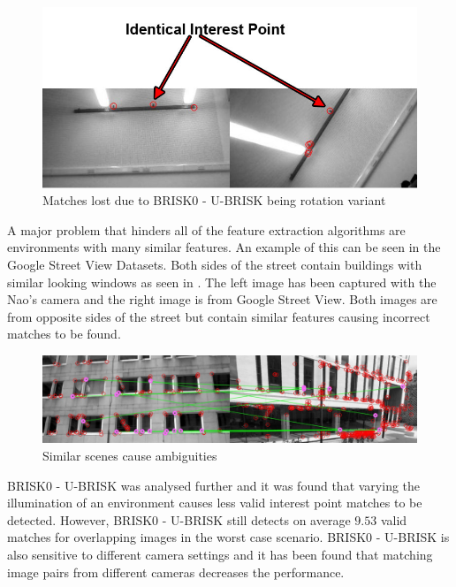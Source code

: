 \begin{figure}
  \centering
    \includegraphics[width=1.0\textwidth]{../Drawings/Matching/rotationsUBRISK_photo.jpg}
    \caption{Matches lost due to BRISK0 - U-BRISK being rotation variant} 
    \label{fig:rotationUbrisk}
\end{figure}

A major problem that hinders all of the feature extraction algorithms are environments with many similar features. An example of this can be seen in the Google Street View Datasets. Both sides of the street contain buildings with similar looking windows as seen in . The left image has been captured with the Nao's camera and the right image is from Google Street View. Both images are from opposite sides of the street but contain similar features causing incorrect matches to be found.\\

\begin{figure}
  \centering
    \includegraphics[width=1.0\textwidth]{../Drawings/Matching/dataset_similar_scene.jpg}
    \caption{Similar scenes cause ambiguities} 
    \label{fig:similarScene}
\end{figure}


BRISK0 - U-BRISK was analysed further and it was found that varying the illumination of an environment causes less valid interest point matches to be detected. However, BRISK0 - U-BRISK still detects on average $9.53$ valid matches for overlapping images in the worst case scenario. BRISK0 - U-BRISK is also sensitive to different camera settings and it has been found that matching image pairs from different cameras decreases the performance.\\

